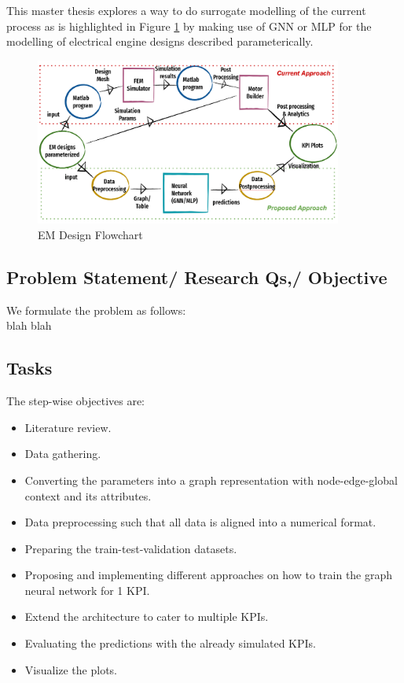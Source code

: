 \documentclass{report} %
\begin{document}

This master thesis explores a way to do surrogate modelling of the current process as is highlighted in Figure \ref{fig:EM Design Flowchart} by making use of \ac{GNN} or \ac{MLP} for the modelling of electrical engine designs described parameterically. \\
\begin{figure}[h]
    \centering
    \includegraphics[width=0.9\textwidth]{./ReportImages/EM_design_flowchart_v2.png} 
    \caption{EM Design Flowchart}
    \label{fig:EM Design Flowchart}
\end{figure}

\subsection*{Problem Statement/ Research Qs,/ Objective}
We formulate the problem as follows: \\ blah blah

\subsection*{Tasks}
The step-wise objectives are:
\begin{itemize}
    \item Literature review.
    \item Data gathering.
    \item Converting the parameters into a graph representation with node-edge-global context and its attributes.
    \item Data preprocessing such that all data is aligned into a numerical format.
    \item Preparing the train-test-validation datasets.
    \item Proposing and implementing different approaches on how to train the graph neural network for 1 \ac{KPI}.
    \item Extend the architecture to cater to multiple \ac{KPI}s.
    \item Evaluating the predictions with the already simulated \ac{KPI}s.
    \item Visualize the plots.
\end{itemize}
\end{document}
